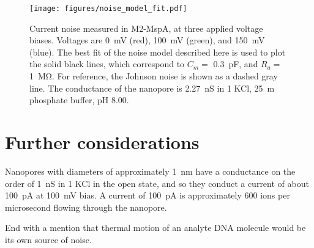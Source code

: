 \begin{figure}[h]
\begin{centering}
\texttt{[image: figures/noise\_model\_fit.pdf]}
\caption[Current noise in MspA fit to a model]{Current noise measured in M2-MspA, at three applied voltage biases.  Voltages are \SI{0}{\mV} (red), \SI{100}{\mV} (green), and \SI{150}{\mV} (blue).  The best fit of the noise model described here is used to plot the solid black lines, which correspond to $C_m = $ \SI{0.3}{\pF}, and $R_a = $ \SI{1}{\mega\ohm}.  For reference, the Johnson noise is shown as a dashed gray line.  The conductance of the nanopore is \SI{2.27}{\nano\siemens} in \SI{1}{\Molar} KCl, \SI{25}{\m\Molar} phosphate buffer, pH \num{8.00}.}
\label{fig:noise_model_fit}
\end{centering}
\end{figure}

\section{Further considerations}

Nanopores with diameters of approximately \SI{1}{\nm} have a conductance on the order of \SI{1}{\nano\siemens} in \SI{1}{\Molar} KCl in the open state, and so they conduct a current of about \SI{100}{\pA} at \SI{100}{\mV} bias.  A current of \SI{100}{\pA} is approximately \num{600} ions per microsecond flowing through the nanopore.

End with a mention that thermal motion of an analyte DNA molecule would be its own source of noise.